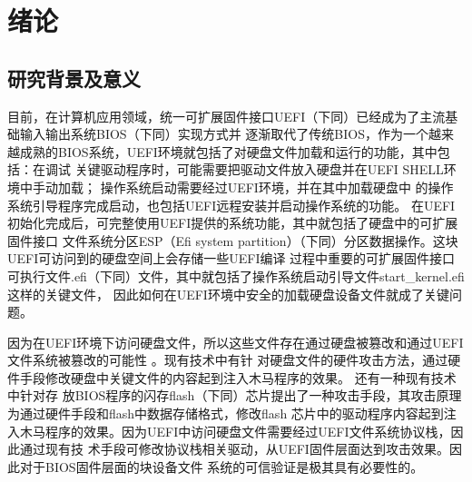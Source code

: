 %
%
\chapter{绪论}
%
%
\section{研究背景及意义}
目前，在计算机应用领域，统一可扩展固件接口UEFI（下同）已经成为了主流基础输入输出系统BIOS（下同）实现方式并
逐渐取代了传统BIOS，作为一个越来越成熟的BIOS系统，UEFI环境就包括了对硬盘文件加载和运行的功能，其中包括：在调试
关键驱动程序时，可能需要把驱动文件放入硬盘并在UEFI SHELL环境中手动加载\cite{english16,english20}；
操作系统启动需要经过UEFI环境，并在其中加载硬盘中
的操作系统引导程序完成启动，也包括UEFI远程安装并启动操作系统的功能\cite{chinese29}。
在UEFI初始化完成后，可完整使用UEFI提供的系统功能，其中就包括了硬盘中的可扩展固件接口
文件系统分区ESP（Efi system partition）（下同）分区数据操作。这块UEFI可访问到的硬盘空间上会存储一些UEFI编译
过程中重要的可扩展固件接口
可执行文件.efi（下同）文件，其中就包括了操作系统启动引导文件start\_kernel.efi这样的关键文件\cite{chinese18}，
因此如何在UEFI环境中安全的加载硬盘设备文件就成了关键问题。
\par 因为在UEFI环境下访问硬盘文件，所以这些文件存在通过硬盘被篡改和通过UEFI文件系统被篡改的可能性
\cite{chinese16}。现有技术中有针
对硬盘文件的硬件攻击方法\cite{english5}，通过硬件手段修改硬盘中关键文件的内容起到注入木马程序的效果。
还有一种现有技术中针对存
放BIOS程序的闪存flash（下同）芯片提出了一种攻击手段，其攻击原理为通过硬件手段和flash中数据存储格式，修改flash
芯片中的驱动程序内容起到注入木马程序的效果。因为UEFI中访问硬盘文件需要经过UEFI文件系统协议栈，因此通过现有技
术手段可修改协议栈相关驱动\cite{english3}，从UEFI固件层面达到攻击效果。因此对于BIOS固件层面的块设备文件
系统的可信验证是极其具有必要性的\cite{english17,english6,english7}。

%
%

